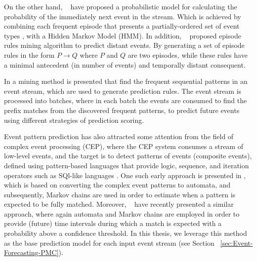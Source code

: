 \par On the other hand, ~\citet{laxman_stream_2008} have proposed a probabilistic model
for calculating the probability of the immediately next event in the stream. Which is achieved by combining each frequent episode that presents a partially-ordered set of event types \cite{mannila1997discovery}, with a Hidden Markov Model (HMM). In addition, ~\citet{fahed_efficient_2014} proposed episode rules mining algorithm to predict distant events. By generating a set of episode rules in the form \(P \rightarrow Q \) where $P$ and $Q$ are two episodes, while these rules have a minimal antecedent (in number of events) and temporally distant  consequent.

\par In \cite{zhou_pattern_2015} a mining method is presented that find the frequent sequential patterns in an event stream, which are used to generate prediction rules. The event stream is processed into batches, where in each batch the events are consumed to find the prefix matches from the discovered frequent patterns, to predict future events using different strategies of prediction scoring.

\par Event pattern prediction has also attracted some attention from the field of complex event processing (CEP), where the CEP system consumes a stream of low-level events, and the target is to detect patterns of events (composite events), defined using pattern-based languages that provide logic, sequence, and iteration operators such as SQl-like languages \cite{Cugola:2012:PFI:2187671.2187677}. One such early approach is presented in \cite{muthusamy_predictive_2010}, which is based on converting the complex event patterns to automata, and subsequently, Markov chains are used in order to estimate when a pattern is expected to be fully matched. Moreover, ~\citet{alevizos2017event} have recently presented a similar approach, where again automata and Markov chains are employed in order to provide (future) time intervals during which a match is expected with a probability above a confidence threshold. In this thesis, we leverage this method as the base prediction model for each input event stream (see Section ~\ref{sec:Event-Forecasting-PMC}). 